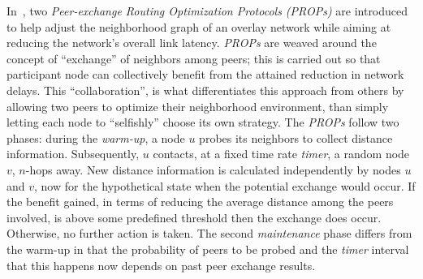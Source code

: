 In~\cite{QCYCZ2007}, two 
\emph{Peer-exchange Routing Optimization Protocols (PROPs)} 
are introduced to help adjust the neighborhood graph of an overlay network
while aiming at reducing the network's overall link latency.
\emph{PROPs} are weaved around the concept of
``exchange'' of neighbors among peers; 
this is carried out so that participant node can collectively 
benefit from the attained reduction in network delays. 
This ``collaboration'', is what differentiates this approach 
from others by allowing two peers to optimize
their neighborhood environment, than simply letting each node to ``selfishly''
choose its own strategy. 
The \emph{PROPs} follow two phases: during the \emph{warm-up},
a node $u$ probes its neighbors to collect distance information. 
Subsequently, $u$ contacts, at a fixed time rate \emph{timer}, 
a random node $v$, $n$-hops away. %
New distance information is calculated independently 
by nodes $u$ and $v$, now for the
hypothetical state when the potential exchange would occur. 
If the benefit gained, in terms of reducing the average distance among the peers involved, is
above some predefined threshold then the exchange does occur.
Otherwise, no further action is taken. 
The second \emph{maintenance} phase
differs from the warm-up in that the probability
of peers to be probed and the \emph{timer} interval that this happens
now depends on past peer exchange results.

